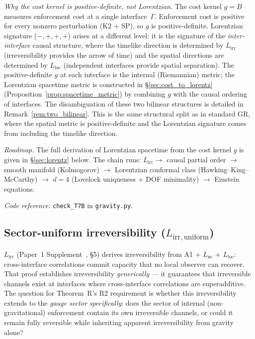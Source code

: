 \documentclass[11pt,a4paper]{article}
\theoremstyle{definition}
\newcommand{\coderef}[2]{\smallskip\noindent\textit{Code reference:} \texttt{#1} in \texttt{#2}.}
\begin{document}
\smallskip\noindent\textit{Why the cost kernel is positive-definite,
not Lorentzian.}\quad
The cost kernel $g = B$ measures enforcement cost at a single
interface~$\Gamma$.  Enforcement cost is positive for every nonzero
perturbation (K2 + SP), so $g$ is positive-definite.  Lorentzian
signature ($-,+,+,+$) arises at a different level: it is the signature
of the \emph{inter-interface} causal structure, where the timelike
direction is determined by $L_{\mathrm{irr}}$ (irreversibility provides
the arrow of time) and the spatial directions are determined by
$L_{\mathrm{loc}}$ (independent interfaces provide spatial separation).
The positive-definite $g$ at each interface is the internal
(Riemannian) metric; the Lorentzian spacetime metric is constructed in
\S\ref{sec:cost_to_lorentz} (Proposition~\ref{prop:spacetime_metric})
by combining $g$ with the causal ordering of interfaces.  The
disambiguation of these two bilinear structures is detailed in
Remark~\ref{rem:two_bilinear}.  This
is the same structural split as in standard GR, where the spatial metric
is positive-definite and the Lorentzian signature comes from including
the timelike direction.

\smallskip\noindent\textit{Roadmap.}\quad
The full derivation of Lorentzian spacetime from the cost kernel $g$ is
given in \S\ref{sec:lorentz} below.  The chain runs:
$L_{\mathrm{irr}} \to$ causal partial order $\to$ smooth manifold
(Kolmogorov) $\to$ Lorentzian conformal class (Hawking--King--McCarthy)
$\to$ $d = 4$ (Lovelock uniqueness + DOF minimality) $\to$ Einstein equations.

\coderef{check\_T7B}{gravity.py}


\subsection{Sector-uniform irreversibility ($L_{\mathrm{irr,uniform}}$)}
\label{sec:Lirr_uniform}

$L_{\mathrm{irr}}$ (Paper~1 Supplement~\cite{BrookeSupplement}, \S5) derives
irreversibility from A1 + $L_{\mathrm{nc}}$ + $L_{\mathrm{loc}}$: cross-interface
correlations commit capacity that no local observer can recover.
That proof establishes irreversibility \emph{generically} --- it
guarantees that irreversible channels exist at interfaces where
cross-interface correlations are superadditive.  The question for
Theorem~R's R2 requirement is whether this irreversibility extends to
the \emph{gauge sector specifically}: does the sector of internal
(non-gravitational) enforcement contain its own irreversible channels,
or could it remain fully reversible while inheriting apparent
irreversibility from gravity alone?
\end{document}
